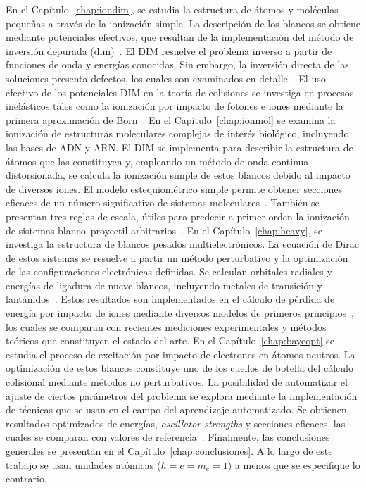 En el Capítulo~\ref{chap:iondim}, se estudia la estructura de átomos y 
moléculas pequeñas a través de la ionización simple. La descripción de 
los blancos se obtiene mediante potenciales efectivos, que resultan de 
la implementación del método de inversión depurada 
(\acs{dim})~\cite{Mendez:16,Mendez:19dim}. El DIM resuelve el problema 
inverso a partir de funciones de onda y energías conocidas. Sin embargo, 
la inversión directa de las soluciones presenta defectos, los cuales son 
examinados en detalle~\cite{Mendez:18,Mitnik:19}. El uso efectivo de los 
potenciales DIM en la teoría de colisiones se investiga en procesos 
inelásticos tales como la ionización por impacto de fotones e iones 
mediante la primera aproximación de Born~\cite{Mendez:19dim}. 
%
En el Capítulo~\ref{chap:ionmol} se examina la ionización de estructuras 
moleculares complejas de interés biológico, incluyendo las bases de ADN y 
ARN. El DIM se implementa para describir la estructura de átomos que las
constituyen y, empleando un método de onda continua distorsionada, se 
calcula la ionización simple de estos blancos debido al impacto de 
diversos iones. El modelo estequiométrico simple permite 
obtener secciones eficaces de un número significativo de sistemas 
moleculares~\cite{Mendez:20ionmol}. También se presentan tres reglas de 
escala, útiles para predecir a primer orden la ionización de sistemas 
blanco--proyectil arbitrarios~\cite{Mendez:20scale}. 
%
En el Capítulo~\ref{chap:heavy}, se investiga la estructura de blancos 
pesados multielectrónicos. La ecuación de Dirac de estos sistemas se 
resuelve a partir un método perturbativo y la optimización de las 
configuraciones electrónicas definidas. Se calculan orbitales radiales y 
energías de ligadura de nueve blancos, incluyendo metales de transición 
y lantánidos~\cite{Mendez:19relat}. Estos resultados son implementados 
en el cálculo de pérdida de energía por impacto de iones mediante 
diversos modelos de primeros principios~\cite{Montanari:20}, los cuales
se comparan con recientes mediciones experimentales y métodos teóricos 
que constituyen el estado del arte.
%
En el Capítulo~\ref{chap:bayeopt} se estudia el proceso de excitación
por impacto de electrones en átomos neutros. La optimización de estos 
blancos constituye uno de los cuellos de botella del cálculo colisional 
mediante métodos no perturbativos. La posibilidad de automatizar el 
ajuste de ciertos parámetros del problema se explora mediante la 
implementación de técnicas que se usan en el campo del aprendizaje 
automatizado. Se obtienen resultados optimizados de energías, 
\textit{oscillator strengths} y secciones eficaces, las cuales se 
comparan con valores de referencia~\cite{Mendez:20baye,Mendez:prep}.
%
Finalmente, las conclusiones generales se presentan en el 
Capítulo~\ref{chap:conclusiones}. A lo largo de este trabajo se usan 
unidades atómicas ($\hbar=e=m_e=1$) a menos que se especifique lo 
contrario.


